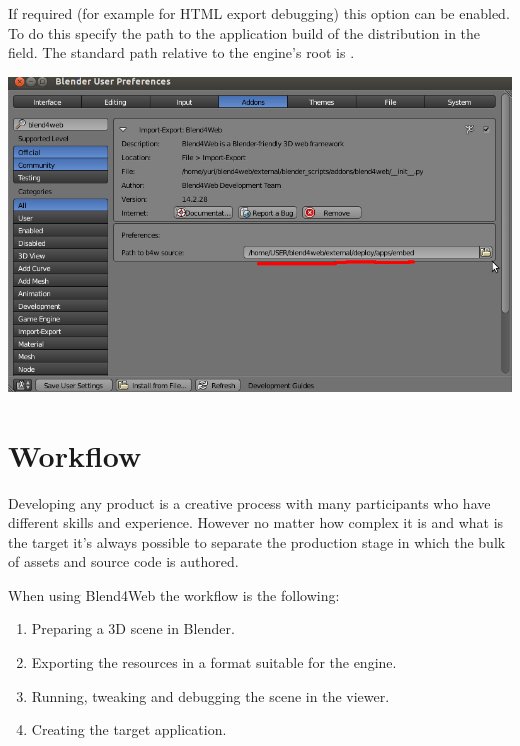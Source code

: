 \documentclass[a4paper,12pt,oneside]{sphinxmanual}
\begin{document}
If required (for example for HTML export debugging) this option can be enabled. To do this specify the path to the  application build of the distribution in the  field. The standard path relative to the engine's root is .

{\hfill\includegraphics[width=1.000\linewidth]{user_preferences_enable_addon_HTML_option.jpg}\hfill}


\chapter{Workflow}
\label{workflow::doc}\label{workflow:working-process-stages}\label{workflow:id1}
Developing any product is a creative process with many participants who have different skills and experience. However no matter how complex it is and what is the target it's always possible to separate the production stage in which the bulk of assets and source code is authored.

When using Blend4Web the workflow is the following:
\begin{enumerate}
\item {} 
Preparing a 3D scene in Blender.

\item {} 
Exporting the resources in a format suitable for the engine.

\item {} 
Running, tweaking and debugging the scene in the viewer.

\item {} 
Creating the target application.

\end{enumerate}
\end{document}
